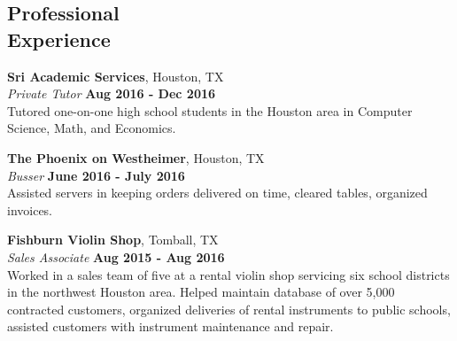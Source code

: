 \documentclass[margin,line]{resume}
\begin{document}
\begin{resume}
    \section{\mysidestyle Professional\\Experience}

    \textbf{Sri Academic Services}, Houston, TX \vspace{2mm}\\\vspace{1mm}%
    \textsl{Private Tutor} \hfill \textbf{Aug 2016 - Dec 2016}\\
    Tutored one-on-one high school students in the Houston area in Computer Science, Math, and Economics.

    \textbf{The Phoenix on Westheimer}, Houston, TX \vspace{2mm}\\\vspace{1mm}%
    \textsl{Busser} \hfill \textbf{June 2016 - July 2016}\\
    Assisted servers in keeping orders delivered on time, cleared tables, organized invoices.

    \textbf{Fishburn Violin Shop}, Tomball, TX \vspace{2mm}\\\vspace{1mm}%
    \textsl{Sales Associate} \hfill \textbf{Aug 2015 -
    Aug 2016}\\
    Worked in a sales team of five at a rental violin shop servicing six school districts in the northwest Houston area.
    Helped maintain database of over 5,000 contracted customers, organized deliveries of rental instruments to public schools, assisted customers with instrument maintenance and repair.
\vspace{1mm}%


\end{resume}
\end{document}
